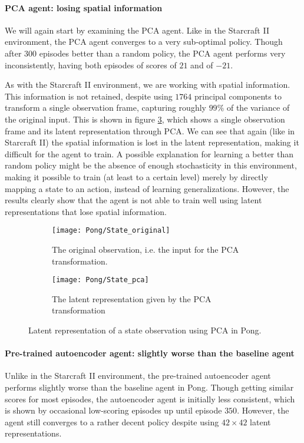\paragraph{PCA agent: losing spatial information}
We will again start by examining the PCA agent. Like in the Starcraft II environment, the PCA agent converges to a very sub-optimal policy. Though after $300$ episodes better than a random policy, the PCA agent performs very inconsistently, having both episodes of scores of $21$ and of $-21$.

As with the Starcraft II environment, we are working with spatial information. This information is not retained, despite using $1764$ principal components to transform a single observation frame, capturing roughly $99\%$ of the variance of the original input. This is shown in figure \ref{fig:pca-state-pong}, which shows a single observation frame and its latent representation through PCA. We can see that again (like in Starcraft II) the spatial information is lost in the latent representation, making it difficult for the agent to train. A possible explanation for learning a better than random policy might be the absence of enough stochasticity in this environment, making it possible to train (at least to a certain level) merely by directly mapping a state to an action, instead of learning generalizations. However, the results clearly show that the agent is not able to train well using latent representations that lose spatial information.


\begin{figure}[h]
	\centering
	\begin{subfigure}[b]{0.3\textwidth}
		\texttt{[image: Pong/State\_original]}
		\caption{The original observation, i.e. the input for the PCA transformation.}
		\label{fig:pca-original-pong} 
	\end{subfigure}\hfill
	\begin{subfigure}[b]{0.3\textwidth}
		\texttt{[image: Pong/State\_pca]}
		\caption{The latent representation given by the PCA transformation}
		\label{fig:pca-latent-pong}
	\end{subfigure}
	\caption{Latent representation of a state observation using PCA in Pong.}
	\label{fig:pca-state-pong}
\end{figure}

\paragraph{Pre-trained autoencoder agent: slightly worse than the baseline agent}
Unlike in the Starcraft II environment, the pre-trained autoencoder agent performs slightly worse than the baseline agent in Pong. Though getting similar scores for most episodes, the autoencoder agent is initially less consistent, which is shown by occasional low-scoring episodes up until episode $350$. However, the agent still converges to a rather decent policy despite using $42 \times 42$ latent representations.

